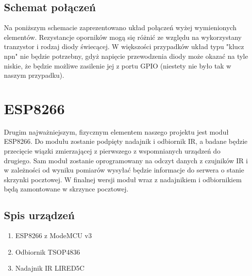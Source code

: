 \subsection{Schemat połączeń}

Na poniższym schemacie zaprezentowano układ połączeń wyżej wymienionych elementów. Rezystancje oporników mogą się różnić ze względu na wykorzystany tranzystor i rodzaj diody świecącej. W większości przypadków układ typu "klucz npn" nie będzie potrzebny, gdyż napięcie przewodzenia diody może okazać na tyle niskie, że będzie możliwe zasilenie jej z portu GPIO (niestety nie było tak w naszym przypadku).

\begin{center}
\end{center}


\section{ESP8266}

Drugim najważniejszym, fizycznym elementem naszego projektu jest moduł ESP8266. Do modułu zostanie podpięty nadajnik i odbiornik IR, a badane będzie przecięcie wiązki zmierzającej z pierwszego z wspomnianych urządzeń do drugiego. Sam moduł zostanie oprogramowany na odczyt danych z czujników IR i w zależności od wyniku pomiarów wysyłać będzie informacje do serwera o stanie skrzynki pocztowej. W finalnej wersji moduł wraz z nadajnikiem i odbiornikiem będą zamontowane w skrzynce pocztowej.
\subsection{Spis urządzeń}

\begin{enumerate}
	\item ESP8266 z ModeMCU v3 \\
	\begin{center}
	\end{center}
	\item Odbiornik TSOP4836 \\
	\begin{center}
	\end{center}
	\item Nadajnik IR LIRED5C \\
	\begin{center}
	\end{center}
\end{enumerate}

